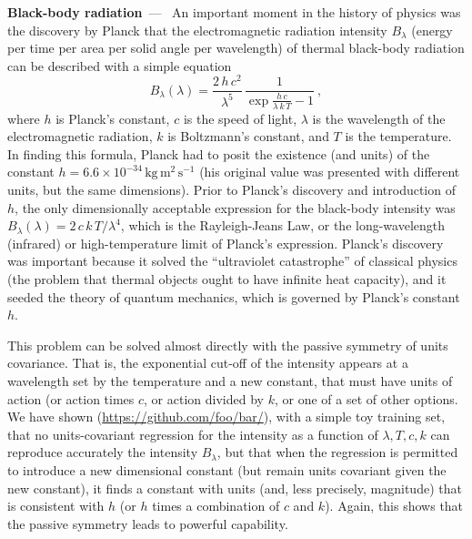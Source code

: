 \documentclass{article}
\newcommand{\unit}[1]{\mathrm{#1}}
\newcommand{\kg}{\unit{kg}}
\newcommand{\m}{\unit{m}}
\newcommand{\s}{\unit{s}}
\renewcommand{\paragraph}[1]{\par\textbf{#1}~---~}
\begin{document}
\paragraph{Black-body radiation}
An important moment in the history of physics was the discovery by Planck that the electromagnetic radiation intensity $B_\lambda$ (energy per time per area per solid angle per wavelength) of thermal black-body radiation can be described with a simple equation \cite{planck}
\begin{equation}
    B_\lambda(\lambda) = \frac{2\,h\,c^2}{\lambda^5}\,\frac{1}{\exp\frac{h\,c}{\lambda\,k\,T} - 1}~,
\end{equation}
where $h$ is Planck's constant,
$c$ is the speed of light,
$\lambda$ is the wavelength of the electromagnetic radiation,
$k$ is Boltzmann's constant,
and $T$ is the temperature.
In finding this formula, Planck had to posit the existence (and units) of the constant $h=6.6\times 10^{-34}\,\kg\,\m^2\,\s^{-1}$ (his original value was presented with different units, but the same dimensions).
Prior to Planck's discovery and introduction of $h$, the only dimensionally acceptable expression for the black-body intensity was $B_\lambda(\lambda)=2\,c\,k\,T/\lambda^4$, which is the Rayleigh-Jeans Law, or the long-wavelength (infrared) or high-temperature limit of Planck's expression.
Planck's discovery was important because it solved the ``ultraviolet catastrophe'' of classical physics (the problem that thermal objects ought to have infinite heat capacity), and it seeded the theory of quantum mechanics, which is governed by Planck's constant $h$.

This problem can be solved almost directly with the passive symmetry of units covariance.
That is, the exponential cut-off of the intensity appears at a wavelength set by the temperature and a new constant, that must have units of action (or action times $c$, or action divided by $k$, or one of a set of other options.
We have shown (\url{https://github.com/foo/bar/}), with a simple toy training set, that no units-covariant regression for the intensity as a function of $\lambda, T, c, k$ can reproduce accurately the intensity $B_\lambda$, but that when the regression is permitted to introduce a new dimensional constant (but remain units covariant given the new constant), it finds a constant with units (and, less precisely, magnitude) that is consistent with $h$ (or $h$ times a combination of $c$ and $k$).
Again, this shows that the passive symmetry leads to powerful capability.
\end{document}
